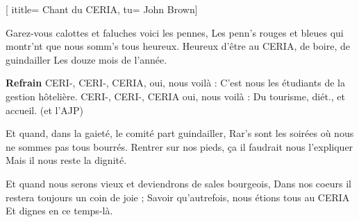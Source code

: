  [
ititle= {Chant du CERIA},
tu= {John Brown}]

\beginverse
Garez-vous calottes et faluches voici les pennes,
Les penn's rouges et bleues qui montr'nt que nous somm's tous heureux.
Heureux d'être au CERIA, de boire, de guindailler
Les douze mois de l'année.
\endverse

\beginchorus
\textbf {Refrain}
CERI-, CERI-, CERIA, oui, nous voilà :
C'est nous les étudiants de la gestion hôtelière.
CERI-, CERI-, CERIA oui, nous voilà :
Du tourisme, diét., et accueil. (et l'AJP)
\endchorus

\beginverse
Et quand, dans la gaieté, le comité part guindailler,
Rar's sont les soirées où nous ne sommes pas tous bourrés.
Rentrer sur nos pieds, ça il faudrait nous l'expliquer
Mais il nous reste la dignité.
\endverse

\beginverse
Et quand nous serons vieux et deviendrons de sales bourgeois,
Dans nos coeurs il restera toujours un coin de joie ;
Savoir qu'autrefois, nous étions tous au CERIA
Et dignes en ce temps-là.
\endverse

\endsong